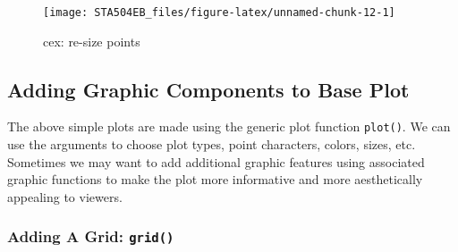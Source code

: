 \documentclass[
]{book}
\begin{document}
\begin{figure}

{\centering \texttt{[image: STA504EB\_files/figure-latex/unnamed-chunk-12-1]} 

}

\caption{cex: re-size points}\label{fig:unnamed-chunk-12}
\end{figure}

\hypertarget{adding-graphic-components-to-base-plot}{%
\subsection{Adding Graphic Components to Base Plot}\label{adding-graphic-components-to-base-plot}}

The above simple plots are made using the generic plot function \texttt{plot()}. We can use the arguments to choose plot types, point characters, colors, sizes, etc. Sometimes we may want to add additional graphic features using associated graphic functions to make the plot more informative and more aesthetically appealing to viewers.

\hypertarget{adding-a-grid-grid}{%
\subsubsection{\texorpdfstring{Adding A Grid: \texttt{grid()}}{Adding A Grid: grid()}}\label{adding-a-grid-grid}}
\end{document}
